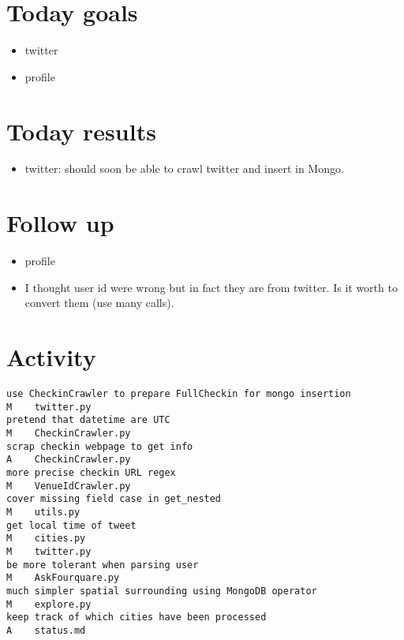 \section*{Today goals}
\begin{itemize}
	\item twitter
	\item profile
\end{itemize}

\section*{Today results}
\begin{itemize}
	\item twitter: should soon be able to crawl twitter and insert in Mongo.
\end{itemize}

\section*{Follow up}
\begin{itemize}
	\item profile
	\item I thought user id were wrong but in fact they are from twitter. Is
		it worth to convert them (use many calls).
\end{itemize}

\section*{Activity}
\begin{verbatim}
use CheckinCrawler to prepare FullCheckin for mongo insertion
M    twitter.py
pretend that datetime are UTC
M    CheckinCrawler.py
scrap checkin webpage to get info
A    CheckinCrawler.py
more precise checkin URL regex
M    VenueIdCrawler.py
cover missing field case in get_nested
M    utils.py
get local time of tweet
M    cities.py
M    twitter.py
be more tolerant when parsing user
M    AskFourquare.py
much simpler spatial surrounding using MongoDB operator
M    explore.py
keep track of which cities have been processed
A    status.md
\end{verbatim}
